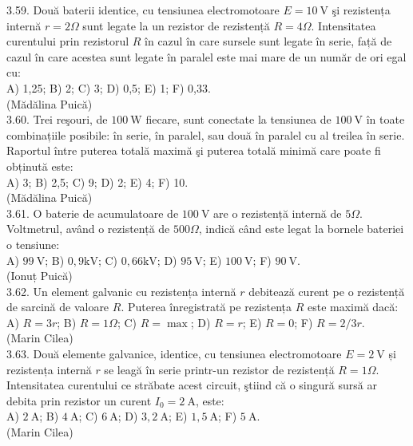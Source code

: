 3.59. Două baterii identice, cu tensiunea electromotoare $E=10 \mathrm{~V}$ şi rezistența internă $r=2 \Omega$ sunt legate la un rezistor de rezistență $R=4 \Omega$. Intensitatea curentului prin rezistorul $R$ în cazul în care sursele sunt legate în serie, față de cazul în care acestea sunt legate în paralel este mai mare de un număr de ori egal cu:\\ A) 1,25; B) 2; C) 3; D) 0,5; E) 1; F) 0,33.\\ (Mădălina Puică)\\

3.60. Trei reşouri, de $100 \mathrm{~W}$ fiecare, sunt conectate la tensiunea de $100 \mathrm{~V}$ în toate combinațiile posibile: în serie, în paralel, sau două în paralel cu al treilea în serie. Raportul între puterea totală maximă şi puterea totală minimă care poate fi obținută este:\\ A) 3; B) 2,5; C) 9; D) 2; E) 4; F) 10.\\ (Mădălina Puică)\\

3.61. O baterie de acumulatoare de $100 \mathrm{~V}$ are o rezistență internă de $5 \Omega$. Voltmetrul, având o rezistență de $500 \Omega$, indică când este legat la bornele bateriei o tensiune:\\ A) $99 \mathrm{~V}$; B) $0,9 \mathrm{kV}$; C) $0,66 \mathrm{kV}$; D) $95 \mathrm{~V}$; E) $100 \mathrm{~V}$; F) $90 \mathrm{~V}$.\\ (Ionuț Puică)\\

3.62. Un element galvanic cu rezistența internă $r$ debitează curent pe o rezistență de sarcină de valoare $R$. Puterea înregistrată pe rezistența $R$ este maximă dacă:\\ A) $R=3 r$; B) $R=1 \Omega$; C) $R=\max$; D) $R=r$; E) $R=0$; F) $R=2 / 3 r$.\\ (Marin Cilea)\\

3.63. Două elemente galvanice, identice, cu tensiunea electromotoare $E=2 \mathrm{~V}$ și rezistența internă $r$ se leagă în serie printr-un rezistor de rezistență $R=1 \Omega$. Intensitatea curentului ce străbate acest circuit, ştiind că o singură sursă ar debita prin rezistor un curent $I_{0}=2 \mathrm{~A}$, este:\\ A) $2 \mathrm{~A}$; B) $4 \mathrm{~A}$; C) $6 \mathrm{~A}$; D) $3,2 \mathrm{~A}$; E) $1,5 \mathrm{~A}$; F) $5 \mathrm{~A}$.\\ (Marin Cilea)\\

